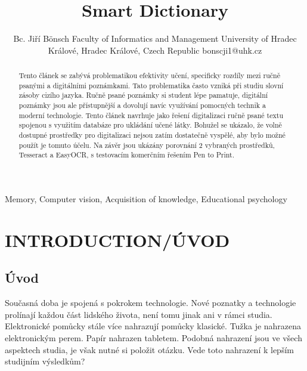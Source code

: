 \documentclass[journal]{IEEEtran}
\title{Smart Dictionary}
\author{Bc. Jiří Bönsch
        \linebreak
        Faculty of Informatics and Management
        \linebreak
        University of Hradec Králové,
        \linebreak
        Hradec Králové, Czech Republic
        \linebreak
        bonscji1@uhk.cz

}
\begin{document}
\maketitle

\begin{abstract}
        Tento článek se zabývá problematikou efektivity učení, specificky rozdíly mezi ručně psanými a digitálními poznámkami.
        Tato problematika často vzniká při studiu slovní zásoby cizího jazyka.
        Ručně psané poznámky si student lépe pamatuje, digitální poznámky jsou ale přístupnější a dovolují navíc využívání pomocných technik a moderní technologie.
        Tento článek navrhuje jako řešení digitalizaci ručně psané textu spojenou s využitím databáze pro ukládání učené látky.
        Bohužel se ukázalo, že volně dostupné prostředky pro digitalizaci nejsou zatím dostatečně vyspělé, aby bylo možné použít je tomuto účelu.
        Na závěr jsou ukázány porovnání 2 vybraných prostředků, Tesseract a EasyOCR, s testovacím komerčním řešením Pen to Print.
\end{abstract}

\begin{IEEEkeywords}
Memory, Computer vision, Acquisition of knowledge, Educational psychology
\end{IEEEkeywords}


\IEEEpeerreviewmaketitle



\section{INTRODUCTION/ÚVOD}

\subsection{Úvod}
Současná doba je spojená s pokrokem technologie.
Nové poznatky a technologie prolínají každou část lidského života, není tomu jinak ani v rámci studia.
Elektronické pomůcky stále více nahrazují pomůcky klasické.
Tužka je nahrazena elektronickým perem.
Papír nahrazen tabletem.
Podobná nahrazení jsou ve všech aspektech studia, je však nutné si položit otázku.
Vede toto nahrazení k lepším studijním výsledkům?
\end{document}
